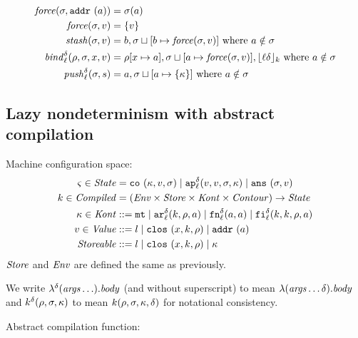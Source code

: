 \documentclass{llncs}
\newcommand{\alt}{\mid}
\begin{document}
\begin{align*}
\mathit{force}(\sigma,{\tt addr{\ }}({a})) &= \sigma(a) \\
\mathit{force}(\sigma,v) &= \{ v \} \\
\mathit{stash}(\sigma,v) &= b, \sigma\sqcup[b \mapsto \mathit{force}(\sigma, v)]
\mbox{ where }a \notin\sigma \\
\mathit{bind}_{\ell}^{\delta}(\rho,\sigma,x,v) &= \rho[x\mapsto a],\sigma\sqcup[a\mapsto\mathit{force}(\sigma,v)],\lfloor {\ell}{\delta} \rfloor_k
\mbox{ where }a \notin\sigma \\
\mathit{push}_{\ell}^{\delta}(\sigma,s) &= a,\sigma\sqcup[a\mapsto\{\kappa\}]
\mbox{ where }a \notin\sigma
\end{align*}

\subsection{Lazy nondeterminism with abstract compilation}

Machine configuration space:
\begin{align*}
\mstate \in \State &= \co{\mkont, \mval, \msto} \alt
                     \ap[_\mlab^\mcntr]{\mval,\mval,\msto,\mkont} \alt
                     \ans{\msto, \mval}\\
\mcomp \in \Compiled &= (\Env \times \Store \times \Kont \times \Counter) \to \State \\
\mkont \in \Kont &::= \kmt \alt
                      \kar[_\mlab^\mcntr]{\mcomp, \menv, \maddr} \alt
                      \kfn[_\mlab^\mcntr]{\maddr, \maddr} \alt
                      \kif[_\mlab^\mcntr]{\mcomp, \mcomp, \menv, \maddr} \\
\mval \in \Value &::= \mlit \alt
                      \clos{\mvar,\mcomp,\menv} \alt
                      \saddr\maddr \\
\Storeable &::= \mlit \alt
                \clos{\mvar,\mcomp,\menv} \alt
                \mkont \\
\end{align*}
$\mathit{Store}$ and $\mathit{Env}$ are defined the same as previously.

We write $\lambda^{\delta}(\mathit{args}\ldots). \mathit{body}$ (and without superscript) to mean
$\lambda(\mathit{args}\ldots {\delta}). \mathit{body}$ and
$k^{\delta}(\rho, \sigma, \kappa)$ to mean $k(\rho, \sigma,
\kappa, {\delta})$ for notational consistency.

Abstract compilation function:
\end{document}
